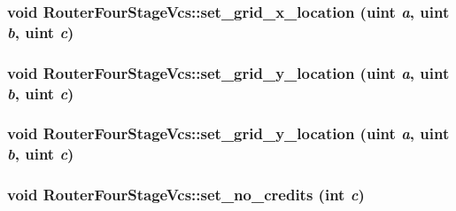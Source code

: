 \hypertarget{classRouterFourStageVcs_c11828571c463389fd410cd4e80768fb}{
\subsubsection[{set\_\-grid\_\-x\_\-location}]{\setlength{\rightskip}{0pt plus 5cm}void RouterFourStageVcs::set\_\-grid\_\-x\_\-location ({\bf uint} {\em a}, \/  {\bf uint} {\em b}, \/  {\bf uint} {\em c})}}
\label{classRouterFourStageVcs_c11828571c463389fd410cd4e80768fb}


\hypertarget{classRouterFourStageVcs_dc137468a451d509ee2e24b2b1380930}{
\subsubsection[{set\_\-grid\_\-y\_\-location}]{\setlength{\rightskip}{0pt plus 5cm}void RouterFourStageVcs::set\_\-grid\_\-y\_\-location ({\bf uint} {\em a}, \/  {\bf uint} {\em b}, \/  {\bf uint} {\em c})}}
\label{classRouterFourStageVcs_dc137468a451d509ee2e24b2b1380930}


\hypertarget{classRouterFourStageVcs_dc137468a451d509ee2e24b2b1380930}{
\subsubsection[{set\_\-grid\_\-y\_\-location}]{\setlength{\rightskip}{0pt plus 5cm}void RouterFourStageVcs::set\_\-grid\_\-y\_\-location ({\bf uint} {\em a}, \/  {\bf uint} {\em b}, \/  {\bf uint} {\em c})}}
\label{classRouterFourStageVcs_dc137468a451d509ee2e24b2b1380930}


\hypertarget{classRouterFourStageVcs_87998d0b2fb2c60ffdc21e20000696b0}{
\subsubsection[{set\_\-no\_\-credits}]{\setlength{\rightskip}{0pt plus 5cm}void RouterFourStageVcs::set\_\-no\_\-credits (int {\em c})}}
\label{classRouterFourStageVcs_87998d0b2fb2c60ffdc21e20000696b0}


